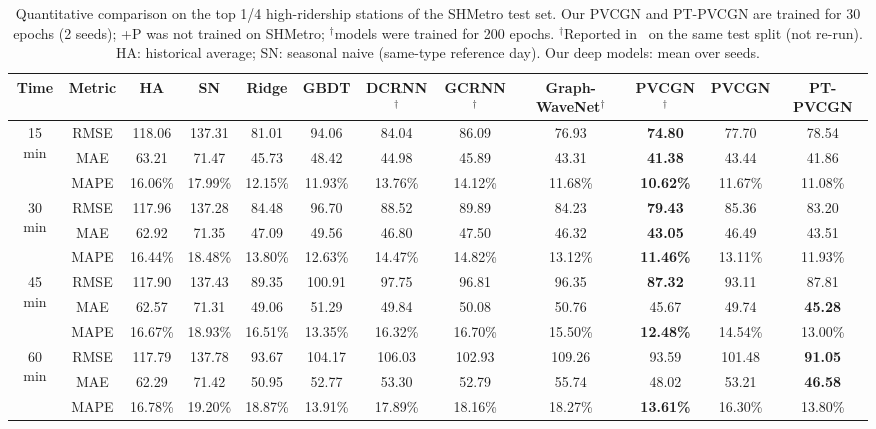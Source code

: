 \begin{table}[t]
\centering
\caption{Quantitative comparison on the top 1/4 high-ridership stations of the SHMetro test set. Our PVCGN and PT-PVCGN are trained for 30 epochs (2 seeds); +P was not trained on SHMetro; $^\dagger$models were trained for 200 epochs. $^\dagger$Reported in~\cite{liu2022pvcgn} on the same test split (not re-run). HA: historical average; SN: seasonal naive (same-type reference day). Our deep models: mean over seeds.}
\label{tab:sh-top}
\scriptsize
\setlength{\tabcolsep}{3.2pt}
\begin{tabular}{cc|cccc|cccc|cc}
\toprule
Time & Metric & HA & SN & Ridge & GBDT & DCRNN$^\dagger$ & GCRNN$^\dagger$ & Graph-WaveNet$^\dagger$ & PVCGN$^\dagger$ & PVCGN & PT-PVCGN \\
\midrule
\multirow{3}{*}{15 min} & RMSE & 118.06 & 137.31 & 81.01 & 94.06 & 84.04 & 86.09 & 76.93 & \textbf{74.80} & 77.70 & 78.54 \\
 & MAE & 63.21 & 71.47 & 45.73 & 48.42 & 44.98 & 45.89 & 43.31 & \textbf{41.38} & 43.44 & 41.86 \\
 & MAPE & 16.06\% & 17.99\% & 12.15\% & 11.93\% & 13.76\% & 14.12\% & 11.68\% & \textbf{10.62\%} & 11.67\% & 11.08\% \\
\midrule
\multirow{3}{*}{30 min} & RMSE & 117.96 & 137.28 & 84.48 & 96.70 & 88.52 & 89.89 & 84.23 & \textbf{79.43} & 85.36 & 83.20 \\
 & MAE & 62.92 & 71.35 & 47.09 & 49.56 & 46.80 & 47.50 & 46.32 & \textbf{43.05} & 46.49 & 43.51 \\
 & MAPE & 16.44\% & 18.48\% & 13.80\% & 12.63\% & 14.47\% & 14.82\% & 13.12\% & \textbf{11.46\%} & 13.11\% & 11.93\% \\
\midrule
\multirow{3}{*}{45 min} & RMSE & 117.90 & 137.43 & 89.35 & 100.91 & 97.75 & 96.81 & 96.35 & \textbf{87.32} & 93.11 & 87.81 \\
 & MAE & 62.57 & 71.31 & 49.06 & 51.29 & 49.84 & 50.08 & 50.76 & 45.67 & 49.74 & \textbf{45.28} \\
 & MAPE & 16.67\% & 18.93\% & 16.51\% & 13.35\% & 16.32\% & 16.70\% & 15.50\% & \textbf{12.48\%} & 14.54\% & 13.00\% \\
\midrule
\multirow{3}{*}{60 min} & RMSE & 117.79 & 137.78 & 93.67 & 104.17 & 106.03 & 102.93 & 109.26 & 93.59 & 101.48 & \textbf{91.05} \\
 & MAE & 62.29 & 71.42 & 50.95 & 52.77 & 53.30 & 52.79 & 55.74 & 48.02 & 53.21 & \textbf{46.58} \\
 & MAPE & 16.78\% & 19.20\% & 18.87\% & 13.91\% & 17.89\% & 18.16\% & 18.27\% & \textbf{13.61\%} & 16.30\% & 13.80\% \\
\bottomrule
\end{tabular}
\end{table}